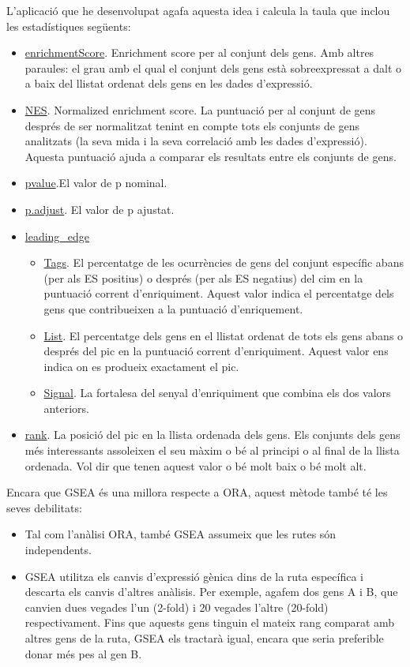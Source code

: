 L'aplicació que he desenvolupat agafa aquesta idea i calcula la taula que inclou les estadístiques següents:

\begin{itemize}
\item \underline{enrichmentScore}. Enrichment score per al conjunt dels gens. Amb altres paraules: el grau amb el qual el conjunt dels gens està sobreexpressat a dalt o a baix del llistat ordenat dels gens en les dades d'expressió.
\item \underline{NES}. Normalized enrichment score. La puntuació per al conjunt de gens després de ser normalitzat tenint en compte tots els conjunts de gens analitzats (la seva mida i la seva correlació amb les dades d'expressió). Aquesta puntuació ajuda a comparar els resultats entre els conjunts de gens.
\item \underline{pvalue}.El valor de p nominal.
\item \underline{p.adjust}. El valor de p ajustat.
\item \underline{leading\_edge}
\begin{itemize}
\item \underline{Tags}. El percentatge de les ocurrències de gens del conjunt específic abans (per als ES positius) o després (per als ES negatius) del cim en la puntuació corrent d'enriquiment. Aquest valor indica el percentatge dels gens que contribueixen a la puntuació d'enriquement. 
\item \underline{List}. El percentatge dels gens en el llistat ordenat de tots els gens abans o després del pic en la puntuació corrent d'enriquiment. Aquest valor ens indica on es produeix exactament el pic. 
\item \underline{Signal}. La fortalesa del senyal d'enriquiment que combina els dos valors anteriors.
\end{itemize}
\item \underline{rank}. La posició del pic en la llista ordenada dels gens. Els conjunts dels gens més interessants assoleixen el seu màxim o bé al principi o al final de la llista ordenada. Vol dir que tenen aquest valor o bé molt baix o bé molt alt.
\end{itemize}

Encara que GSEA és una millora respecte a ORA, aquest mètode també té les seves debilitats: 
\begin{itemize}
\item Tal com l’anàlisi ORA, també GSEA assumeix que les rutes són independents.
\item GSEA utilitza els canvis d’expressió gènica dins de la ruta específica i descarta els canvis d’altres anàlisis. Per exemple, agafem dos gens A i B, que canvien dues vegades l’un (2-fold) i 20 vegades l’altre (20-fold) respectivament. Fins que aquests gens tinguin el mateix rang comparat amb altres gens de la ruta, GSEA els tractarà igual, encara que seria preferible donar més pes al gen B.
\end{itemize}

